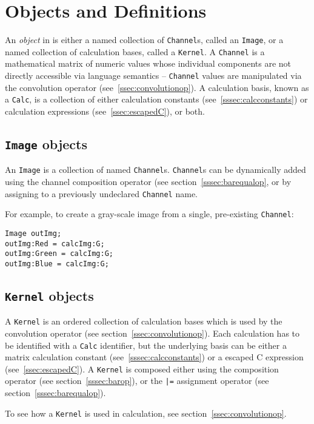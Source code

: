 \section{Objects and Definitions}
\label{sec:objdef}
An \emph{object} in \sys{} is either a named collection of \texttt{Channel}s, called an
\texttt{Image}, or a named collection of calculation bases, called a
\texttt{Kernel}. A \texttt{Channel} is a mathematical matrix of numeric values
whose individual components are not directly accessible via \sys{} language
semantics -- \texttt{Channel} values are manipulated via the convolution
operator (see~\ref{ssec:convolutionop}). A calculation basis, known as a
\texttt{Calc}, is a collection of either calculation constants
(see~\ref{sssec:calcconstants}) or calculation expressions (see~\ref{ssec:escapedC}),
or both.

\subsection{\texttt{Image} objects}
\label{ssec:images}
An \texttt{Image} is a collection of named \texttt{Channel}s. \texttt{Channel}s can
be dynamically added  using the channel composition
operator (see section~\ref{sssec:barequalop}, or by assigning to a previously
undeclared \texttt{Channel} name. 

For example, to create a gray-scale image from a single, pre-existing
\texttt{Channel}:
\begin{lstlisting}[language=CLAM,escapechar=\%]
Image outImg;
outImg:Red = calcImg:G;
outImg:Green = calcImg:G;
outImg:Blue = calcImg:G;
\end{lstlisting}

\subsection{\texttt{Kernel} objects}
\label{ssec:kernels}
A \texttt{Kernel} is an ordered collection of calculation bases which is used by the convolution
operator (see section~\ref{ssec:convolutionop}). Each calculation has to be identified with a \texttt{Calc}
identifier, but the underlying basis can be either
a matrix calculation constant (see~\ref{sssec:calcconstants}) or a escaped C expression
(see~\ref{ssec:escapedC}). A \texttt{Kernel} is composed either using the composition
operator (see section~\ref{sssec:barop}), or the \texttt{|=} assignment operator (see section~\ref{sssec:barequalop}).

To see how a \texttt{Kernel} is used in calculation, see section~\ref{ssec:convolutionop}.
